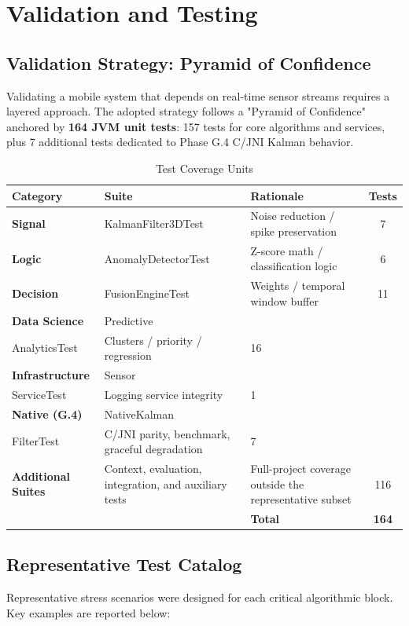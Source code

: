 \chapter{Validation and Testing}
\label{ch:Evaluation}

\section{Validation Strategy: Pyramid of Confidence}
Validating a mobile system that depends on real-time sensor streams requires a layered approach. The adopted strategy follows a "Pyramid of Confidence" anchored by \textbf{164 JVM unit tests}: 157 tests for core algorithms and services, plus 7 additional tests dedicated to Phase G.4 C/JNI Kalman behavior.

\begin{table}[ht]
\centering
\caption{Test Coverage Units}
{\small
\begin{tabular}{@{}L{2.7cm}L{3.7cm}L{4.4cm}c@{}}
\toprule
\textbf{Category} & \textbf{Suite} & \textbf{Rationale} & \textbf{Tests} \\ \midrule
\textbf{Signal} & KalmanFilter3DTest & Noise reduction / spike preservation & 7 \\
\textbf{Logic} & AnomalyDetectorTest & Z-score math / classification logic & 6 \\
\textbf{Decision} & FusionEngineTest & Weights / temporal window buffer & 11 \\
\textbf{Data Science} & Predictive\\AnalyticsTest & Clusters / priority / regression & 16 \\
\textbf{Infrastructure} & Sensor\\ServiceTest & Logging service integrity & 1 \\
\textbf{Native (G.4)} & NativeKalman\\FilterTest & C/JNI parity, benchmark, graceful degradation & 7 \\ \midrule
\textbf{Additional Suites} & Context, evaluation, integration, and auxiliary tests & Full-project coverage outside the representative subset & 116 \\ \midrule
 & & \textbf{Total} & \textbf{164} \\ \bottomrule
\end{tabular}
}
\end{table}


\section{Representative Test Catalog}
Representative stress scenarios were designed for each critical algorithmic block. Key examples are reported below:

